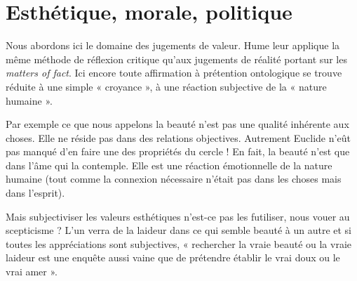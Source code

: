 
\section{Esthétique, morale, politique}
Nous abordons ici le domaine des jugements de valeur.
Hume leur applique la même méthode de réflexion critique
qu'aux jugements de réalité portant sur les {\it matters of fact}.
Ici encore toute affirmation à prétention ontologique se
trouve réduite à une simple « croyance », à une réaction
subjective de la « nature humaine ».

Par exemple ce que nous appelons la beauté n’est pas
une qualité inhérente aux choses. Elle ne réside pas dans
des relations objectives. Autrement Euclide n’eût pas
manqué d’en faire une des propriétés du cercle ! En fait,
la beauté n’est que dans l’âme qui la contemple. Elle
est une réaction émotionnelle de la nature humaine (tout
comme la connexion nécessaire n’était pas dans les choses
mais dans l’esprit).

Mais subjectiviser les valeurs esthétiques n'est-ce pas
les futiliser, nous vouer au scepticisme ? L’un verra de la
laideur dans ce qui semble beauté à un autre et si toutes les
appréciations sont subjectives, « rechercher la vraie beauté
ou la vraie laideur est une enquête aussi vaine que de
prétendre établir le vrai doux ou le vrai amer ».


